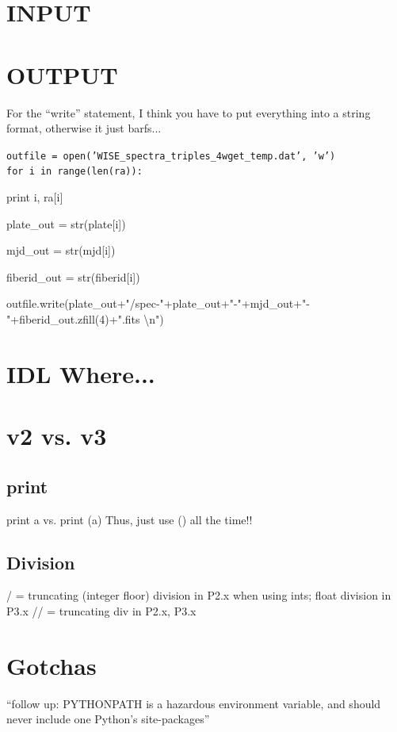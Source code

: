 \documentclass[11pt,a4paper]{article}
\begin{document}
\section{INPUT}


\section{OUTPUT}
For the ``write'' statement, I think you have to put everything into 
a string format, otherwise it just barfs... \\

\noindent
{\tt  outfile = open('WISE\_spectra\_triples\_4wget\_temp.dat', 'w') \\
for i in range(len(ra)): 

    print i, ra[i] 

    plate\_out = str(plate[i])

    mjd\_out = str(mjd[i]) 

    fiberid\_out = str(fiberid[i])

    outfile.write(plate\_out+"/spec-"+plate\_out+"-"+mjd\_out+"-"+fiberid\_out.zfill(4)+".fits \textbackslash n")
}







\section{IDL Where...}


\section{v2 vs. v3}
\subsection{print}
print a vs. print (a)
Thus, just use () all the time!!

\subsection{Division}
/ = truncating (integer floor) division in P2.x when using ints; float division in P3.x
// = truncating div in P2.x, P3.x 


\section{Gotchas}
``follow up: PYTHONPATH is a hazardous environment variable, and should never include one Python's site-packages'' 
\end{document}
